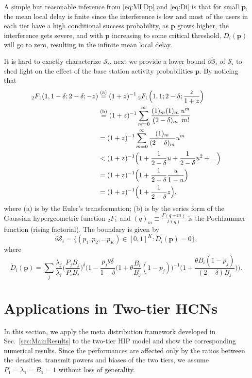 \documentclass[12pt,draftclsnofoot,journal,onecolumn]{IEEEtran}
\def\eqa{\stackrel{{\rm (a)}}{=}}
\def\eqb{\stackrel{{\rm (b)}}{=}}
\begin{document}
A simple but reasonable inference from \eqref{eq:MLDp} and \eqref{eq:Di} is that for small $\bm p$, the mean local delay is finite since the interference is low and most of the users in each tier have a high conditional success probability, as $\bm p$ grows higher, the interference gets severe, and with $\bm p$ increasing to some critical threshold, $D_i(\bm p)$ will go to zero, resulting in the infinite mean local delay.

It is hard to exactly characterize $\mathcal{S}_i$, next we provide a lower bound $\partial\mathcal{\check S}_i$ of $\mathcal{S}_i$ to shed light on the effect of the base station activity probabilities $\bm{p}$. By noticing that 
\begin{align}
_2F_1(1,1-\delta;2-\delta;-z) &\eqa (1+z)^{-1} \:_2F_1\Big(1,1;2-\delta;\frac{z}{1+z}\Big) \nonumber\\
&\eqb (1+z)^{-1} \sum\limits_{m=0}^{\infty} \frac{(1)_m (1)_m}{(2-\delta)_m}\frac{u^m}{m!} \nonumber\\
&= (1+z)^{-1} \sum\limits_{m=0}^{\infty} \frac{(1)_m}{(2-\delta)_m} u^m \nonumber\\
&< (1+z)^{-1}\Big(1+ \frac{1}{2-\delta}u +\frac{1}{2-\delta}u^2 + ... \Big) \nonumber\\
&= (1+z)^{-1}\Big(1+\frac{1}{2-\delta}\frac{u}{1-u}\Big) \nonumber\\
&= (1+z)^{-1}\Big(1+\frac{1}{2-\delta}z\Big),
\end{align}  
where (a) is by the Euler's transformation; (b) is by the series form of the Gaussian hypergeometric function $_2F_1$ and  $(q)_m\equiv\frac{\Gamma(q+m)}{\Gamma(q)}$ is the Pochhammer function (rising factorial). The boundary is given by
\begin{equation}\label{eq:FiniteInnerBound}
\partial\mathcal{\check S}_i=\{(p_1,p_2,...p_K)\in[0,1]^K:\check D_i(\bm p)=0\},
\end{equation}
where 
\begin{equation}\label{eq:checkDfun}
\check D_i(\bm p) =  \sum\limits_j\frac{\lambda_j}{\lambda_i}\bigg(\frac{P_jB_j}{P_iB_i}\Big)^\delta \Big(1-\frac{p_j\theta\delta}{1-\delta}\Big(1+\theta\frac{B_i}{B_j}(1-p_j)\Big)^{-1}\Big(1+\frac{\theta B_i(1-p_j)}{(2-\delta)B_j}\Big)\bigg).
\end{equation}
 
\section{Applications in Two-tier HCNs}\label{sec:Apps}
In this section, we apply the meta distribution framework developed in Sec.~\ref{sec:MainResults} to the two-tier HIP model and show the corresponding numerical results. Since the performances are affected only by the ratios between the densities, transmit powers and biases of the two tiers, we assume $P_1=\lambda_1=B_1=1$ without loss of generality.
\end{document}
